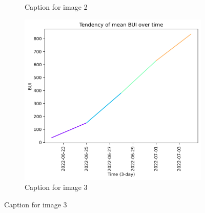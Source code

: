 \begin{figure}[h]
\begin{subfigure}{0.3\textwidth}
        \caption{Caption for image 2}
        \label{fig:img2}
    \end{subfigure}
    \hfill
    \begin{subfigure}{0.3\textwidth}
        \centering
        \includegraphics[width=\textwidth]{graphs/2022/tendency/2022_tendency_graph_BUI.png}
        \caption{Caption for image 3}
        \label{fig:img3}
    \end{subfigure}
    
    \label{fig:all_images}
\end{figure}